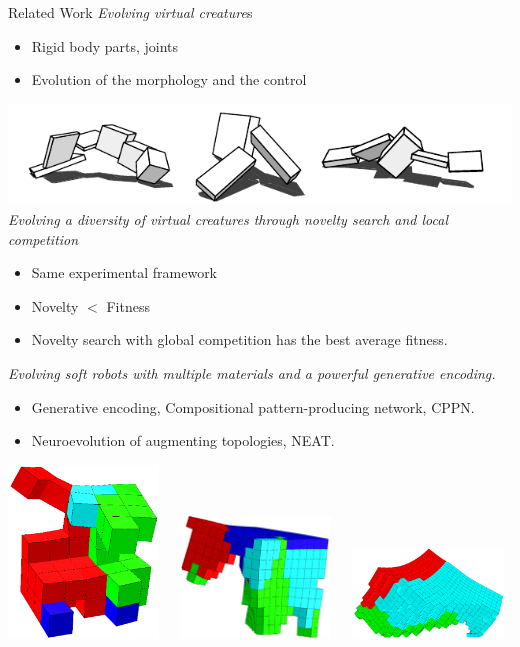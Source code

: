 \documentclass{beamer}
\begin{document}
\begin{frame}[allowframebreaks]{Related Work}
\textit{Evolving virtual creature}s~\cite{sims1994evolving}
\begin{itemize}
\item Rigid body parts, joints
\item Evolution of the morphology and the control
\end{itemize}
\includegraphics[scale=0.5]{figures/evolvingVirtualCreatures.png}\\
\textit{Evolving a diversity of virtual creatures through novelty search and local competition} ~\cite{lehman2011evolving}
\begin{itemize}
\item Same experimental framework
\item Novelty $<$ Fitness
\item Novelty search with global competition has the best average fitness.
\end{itemize}
\newpage
\textit{Evolving soft robots with multiple materials and a powerful generative encoding.}~\cite{cheney2013unshackling}
\begin{itemize}
\item Generative encoding, Compositional pattern-producing network, CPPN.
\item Neuroevolution of augmenting topologies, NEAT.
\end{itemize}
\vspace{0.3cm}
\includegraphics[width=0.3\textwidth,height=0.25\textheight]{figures/unshacklingEvolutionFigure1.png}\	\	\	
\includegraphics[width=0.3\textwidth,height=0.25\textheight]{figures/unshacklingEvolutionFigure2.png}\	\	\	
\includegraphics[width=0.3\textwidth,height=0.25\textheight]{figures/unshacklingEvolutionFigure3.png}
\end{frame}
\end{document}
